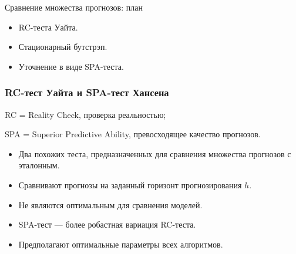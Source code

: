 
\begin{frame} %


\end{frame}



\begin{frame}{Сравнение множества прогнозов: план}
  \begin{itemize}[<+->]
    \item RC-теста Уайта.
    \item Стационарный \alert{бутстрэп}.
    \item \alert{Уточнение} в виде SPA-теста.
  \end{itemize}

\end{frame}


\begin{frame}
    \frametitle{RC-тест Уайта и SPA-тест Хансена}

    RC = Reality Check, проверка реальностью;

    SPA = Superior Predictive Ability, превосходящее качество прогнозов.
    \pause 

    \begin{itemize}
        \item Два похожих теста, предназначенных для сравнения \alert{множества} прогнозов с эталонным. \pause
        \item Сравнивают прогнозы на \alert{заданный горизонт} прогнозирования $h$. \pause
        \item Не являются оптимальным для \alert{сравнения моделей}. \pause
        \item SPA-тест — более \alert{робастная} вариация RC-теста. \pause
        \item Предполагают \alert{оптимальные} параметры всех алгоритмов.
    \end{itemize}

\end{frame}

